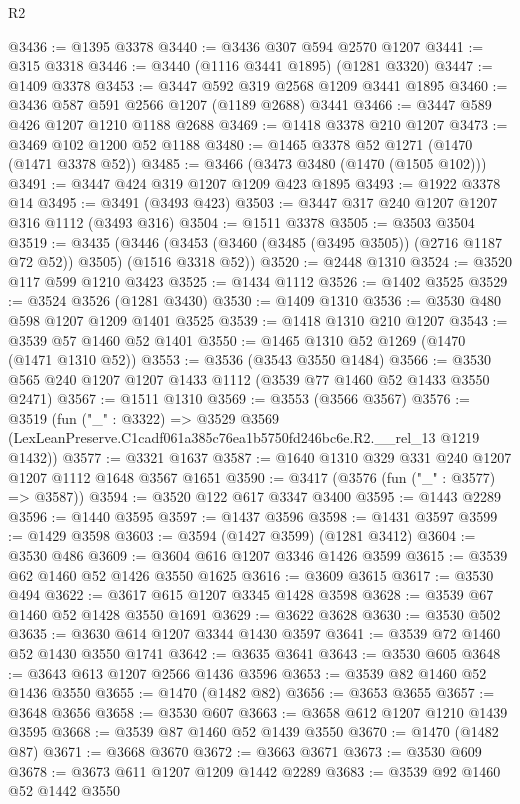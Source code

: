 \begin{lexlean}{R2}
\begin{coremodule}
@3436 := @1395 @3378
@3440 := @3436 @307 @594 @2570 @1207
@3441 := @315 @3318
@3446 := @3440 (@1116 @3441 @1895) (@1281 @3320)
@3447 := @1409 @3378
@3453 := @3447 @592 @319 @2568 @1209 @3441 @1895
@3460 := @3436 @587 @591 @2566 @1207 (@1189 @2688) @3441
@3466 := @3447 @589 @426 @1207 @1210 @1188 @2688
@3469 := @1418 @3378 @210 @1207
@3473 := @3469 @102 @1200 @52 @1188
@3480 := @1465 @3378 @52 @1271 (@1470 (@1471 @3378 @52))
@3485 := @3466 (@3473 @3480 (@1470 (@1505 @102)))
@3491 := @3447 @424 @319 @1207 @1209 @423 @1895
@3493 := @1922 @3378 @14
@3495 := @3491 (@3493 @423)
@3503 := @3447 @317 @240 @1207 @1207 @316 @1112 (@3493 @316)
@3504 := @1511 @3378
@3505 := @3503 @3504
@3519 := @3435
    (@3446 (@3453 (@3460 (@3485 (@3495 @3505)) (@2716 @1187 @72 @52)) @3505) (@1516 @3318 @52))
@3520 := @2448 @1310
@3524 := @3520 @117 @599 @1210 @3423
@3525 := @1434 @1112
@3526 := @1402 @3525
@3529 := @3524 @3526 (@1281 @3430)
@3530 := @1409 @1310
@3536 := @3530 @480 @598 @1207 @1209 @1401 @3525
@3539 := @1418 @1310 @210 @1207
@3543 := @3539 @57 @1460 @52 @1401
@3550 := @1465 @1310 @52 @1269 (@1470 (@1471 @1310 @52))
@3553 := @3536 (@3543 @3550 @1484)
@3566 := @3530 @565 @240 @1207 @1207 @1433 @1112 (@3539 @77 @1460 @52 @1433 @3550 @2471)
@3567 := @1511 @1310
@3569 := @3553 (@3566 @3567)
@3576 := @3519
    (fun ("_" : @3322) =>
    @3529 @3569 (LexLeanPreserve.C1cadf061a385c76ea1b5750fd246bc6e.R2.__rel_13 @1219 @1432))
@3577 := @3321 @1637
@3587 := @1640 @1310 @329 @331 @240 @1207 @1207 @1112 @1648 @3567 @1651
@3590 := @3417 (@3576 (fun ("_" : @3577) => @3587))
@3594 := @3520 @122 @617 @3347 @3400
@3595 := @1443 @2289
@3596 := @1440 @3595
@3597 := @1437 @3596
@3598 := @1431 @3597
@3599 := @1429 @3598
@3603 := @3594 (@1427 @3599) (@1281 @3412)
@3604 := @3530 @486
@3609 := @3604 @616 @1207 @3346 @1426 @3599
@3615 := @3539 @62 @1460 @52 @1426 @3550 @1625
@3616 := @3609 @3615
@3617 := @3530 @494
@3622 := @3617 @615 @1207 @3345 @1428 @3598
@3628 := @3539 @67 @1460 @52 @1428 @3550 @1691
@3629 := @3622 @3628
@3630 := @3530 @502
@3635 := @3630 @614 @1207 @3344 @1430 @3597
@3641 := @3539 @72 @1460 @52 @1430 @3550 @1741
@3642 := @3635 @3641
@3643 := @3530 @605
@3648 := @3643 @613 @1207 @2566 @1436 @3596
@3653 := @3539 @82 @1460 @52 @1436 @3550
@3655 := @1470 (@1482 @82)
@3656 := @3653 @3655
@3657 := @3648 @3656
@3658 := @3530 @607
@3663 := @3658 @612 @1207 @1210 @1439 @3595
@3668 := @3539 @87 @1460 @52 @1439 @3550
@3670 := @1470 (@1482 @87)
@3671 := @3668 @3670
@3672 := @3663 @3671
@3673 := @3530 @609
@3678 := @3673 @611 @1207 @1209 @1442 @2289
@3683 := @3539 @92 @1460 @52 @1442 @3550

\end{coremodule}
\end{lexlean}
